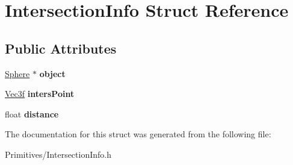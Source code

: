 \hypertarget{struct_intersection_info}{}\section{Intersection\+Info Struct Reference}
\label{struct_intersection_info}
\subsection*{Public Attributes}
\begin{DoxyCompactItemize}
\item 
\mbox{\label{struct_intersection_info_a44961e762372a8b82d7df4b8b26d02fd}} 
\hyperlink{class_sphere}{Sphere} $\ast$ {\bfseries object}
\item 
\mbox{\label{struct_intersection_info_a981e179dbf67e4d511b36f6704f812a7}} 
\hyperlink{struct_vec3f}{Vec3f} {\bfseries inters\+Point}
\item 
\mbox{\label{struct_intersection_info_af4044613d62580c855b795b1a5789a37}} 
float {\bfseries distance}
\end{DoxyCompactItemize}


The documentation for this struct was generated from the following file\+:\begin{DoxyCompactItemize}
\item 
Primitives/Intersection\+Info.\+h\end{DoxyCompactItemize}
